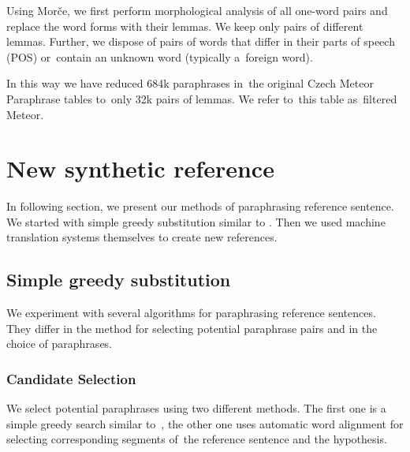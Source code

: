 \documentclass[11pt]{article}
\begin{document}
Using Morče, we first perform morphological analysis of all one-word pairs and replace 
the word forms with their lemmas.  We keep only pairs of different lemmas. Further, we
 dispose of pairs of words that differ in their parts of speech (POS) or~contain an 
unknown word (typically a~foreign word). 

In this way we have reduced 684k paraphrases in~the original Czech Meteor Paraphrase tables 
to~only 32k pairs of lemmas. We refer to~this table as~filtered Meteor.

\section{New synthetic reference}
In following section, we present our methods of paraphrasing reference sentence. We started
with simple greedy substitution similar to \cite{kauchak}. Then we used machine translation
systems themselves to create new references.

\subsection{Simple greedy substitution}
We experiment with several algorithms for paraphrasing reference sentences. They differ
in the method for selecting potential paraphrase pairs and in the choice of paraphrases.

\subsubsection{Candidate Selection}
We select potential paraphrases using two different methods. The first one is a simple 
greedy search similar to~, the other one uses automatic word alignment 
for selecting corresponding segments of~the reference sentence and the hypothesis.
\end{document}
